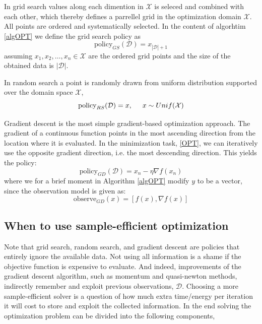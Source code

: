 \begin{testexample}
    In grid search values along each dimention in $\mathcal{X}$ is seleced and combined with each
    other, which thereby defines a parrellel grid in the optimization domain $\mathcal{X}$. All
    points are ordered and systematically selected. In the content of algorhtim \ref{algOPT} we define
    the grid search policy as 
    $$\text{policy}_{GS}(\mathcal{D}) = x_{|\mathcal{D}|+1}$$
    assuming $x_1,x_2, \dots, x_{n} \in \mathcal{X}$ are the ordered grid points and the size of the obtained 
    data is $|\mathcal{D}|$.
\end{testexample}
\begin{testexample}
    In random search a point is randomly drawn from uniform distribution supported over the domain
    space $\mathcal{X}$, 
    $$\text{policy}_{RS}(\mathcal{D}) = x, \hspace{0.5cm} x \sim Unif(\mathcal{X})$$
\end{testexample}
\begin{testexample}
    Gradient descent is the most simple gradient-based optimization approach. The gradient of a continuous 
    function points in the most ascending direction from the location where it is evaluated.
    In the minimization task, \eqref{OPT}, we can iteratively use the opposite gradient direction, i.e. the most 
    descending direction. This yields the policy:
    $$\text{policy}_{GD}(\mathcal{D}) = x_n - \eta \nabla f(x_n)$$
    where we for a brief moment in Algorithm \eqref{algOPT} modify $y$ to be a vector, since the observation model 
    is given as:
    $$\text{observe}_{GD}(x) = [f(x), \nabla f(x)]$$
\end{testexample}

\subsection{When to use sample-efficient optimization}
Note that grid search, random search, and gradient descent are policies that entirely ignore the
available data. Not using all information is a shame if the objective function is expensive to
evaluate. And indeed, improvements of the gradient descent algorithm, such as momentum and
quasi-newton methods, indirectly remember and exploit previous observations, $\mathcal{D}$. Choosing a
more sample-efficient solver is a question of how much extra time/energy per iteration it will cost to
store and exploit the collected information. In the end solving the optimization problem can be divided
into the following components, 

